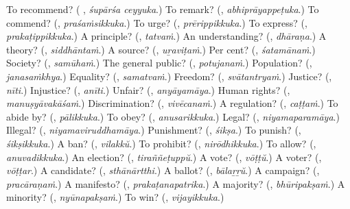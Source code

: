 \begin{tcolorbox}[breakable,colback=teal!4,colframe=teal!35!black,title={Before you move on}]
To recommend? (\textbf{ }, \emph{śupārśa ceyyuka}.) To remark? (\textbf{}, \emph{abhiprāyappeṭuka}.) To commend? (\textbf{}, \emph{praśaṁsikkuka}.) To urge? (\textbf{}, \emph{prērippikkuka}.) To express? (\textbf{}, \emph{prakaṭippikkuka}.) A principle? (\textbf{}, \emph{tatvaṁ}.) An understanding? (\textbf{}, \emph{dhāraṇa}.) A theory? (\textbf{}, \emph{siddhāntaṁ}.) A source? (\textbf{}, \emph{uṟaviṭaṁ}.) Per cent? (\textbf{}, \emph{śatamānaṁ}.) Society? (\textbf{}, \emph{samūhaṁ}.) The general public? (\textbf{}, \emph{potujanaṁ}.) Population? (\textbf{}, \emph{janasaṁkhya}.) Equality? (\textbf{}, \emph{samatvaṁ}.) Freedom? (\textbf{}, \emph{svātantryaṁ}.) Justice? (\textbf{}, \emph{nīti}.) Injustice? (\textbf{}, \emph{anīti}.) Unfair? (\textbf{}, \emph{anyāyamāya}.) Human rights? (\textbf{}, \emph{manuṣyāvakāśaṁ}.) Discrimination? (\textbf{}, \emph{vivēcanaṁ}.) A regulation? (\textbf{}, \emph{caṭṭaṁ}.) To abide by? (\textbf{}, \emph{pālikkuka}.) To obey? (\textbf{}, \emph{anusarikkuka}.) Legal? (\textbf{}, \emph{niyamaparamāya}.) Illegal? (\textbf{}, \emph{niyamaviruddhamāya}.) Punishment? (\textbf{}, \emph{śikṣa}.) To punish? (\textbf{}, \emph{śikṣikkuka}.) A ban? (\textbf{}, \emph{vilakkŭ}.) To prohibit? (\textbf{}, \emph{nirōdhikkuka}.) To allow? (\textbf{}, \emph{anuvadikkuka}.) An election? (\textbf{}, \emph{tiraññeṭuppŭ}.) A vote? (\textbf{}, \emph{vōṭṭŭ}.) A voter? (\textbf{}, \emph{vōṭṭar}.) A candidate? (\textbf{}, \emph{sthānārtthi}.) A ballot? (\textbf{}, \emph{bālaṟṟŭ}.) A campaign? (\textbf{}, \emph{pracāraṇaṁ}.) A manifesto? (\textbf{}, \emph{prakaṭanapatrika}.) A majority? (\textbf{}, \emph{bhūripakṣaṁ}.) A minority? (\textbf{}, \emph{nyūnapakṣaṁ}.) To win? (\textbf{}, \emph{vijayikkuka}.)
\end{tcolorbox}
